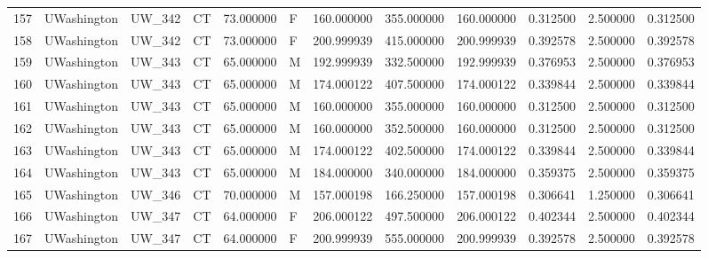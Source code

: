 \begin{tabular}{llllrlrrrrrr}
157    &     UWashington &       UW\_342 &                 CT &  73.000000 &        F &       160.000000 &    355.000000 &  160.000000 &               0.312500 &            2.500000 &          0.312500 \\
158    &     UWashington &       UW\_342 &                 CT &  73.000000 &        F &       200.999939 &    415.000000 &  200.999939 &               0.392578 &            2.500000 &          0.392578 \\
159    &     UWashington &       UW\_343 &                 CT &  65.000000 &        M &       192.999939 &    332.500000 &  192.999939 &               0.376953 &            2.500000 &          0.376953 \\
160    &     UWashington &       UW\_343 &                 CT &  65.000000 &        M &       174.000122 &    407.500000 &  174.000122 &               0.339844 &            2.500000 &          0.339844 \\
161    &     UWashington &       UW\_343 &                 CT &  65.000000 &        M &       160.000000 &    355.000000 &  160.000000 &               0.312500 &            2.500000 &          0.312500 \\
162    &     UWashington &       UW\_343 &                 CT &  65.000000 &        M &       160.000000 &    352.500000 &  160.000000 &               0.312500 &            2.500000 &          0.312500 \\
163    &     UWashington &       UW\_343 &                 CT &  65.000000 &        M &       174.000122 &    402.500000 &  174.000122 &               0.339844 &            2.500000 &          0.339844 \\
164    &     UWashington &       UW\_343 &                 CT &  65.000000 &        M &       184.000000 &    340.000000 &  184.000000 &               0.359375 &            2.500000 &          0.359375 \\
165    &     UWashington &       UW\_346 &                 CT &  70.000000 &        M &       157.000198 &    166.250000 &  157.000198 &               0.306641 &            1.250000 &          0.306641 \\
166    &     UWashington &       UW\_347 &                 CT &  64.000000 &        F &       206.000122 &    497.500000 &  206.000122 &               0.402344 &            2.500000 &          0.402344 \\
167    &     UWashington &       UW\_347 &                 CT &  64.000000 &        F &       200.999939 &    555.000000 &  200.999939 &               0.392578 &            2.500000 &          0.392578 \\

\end{tabular}
